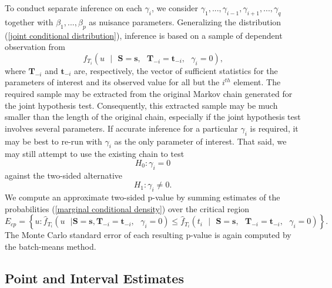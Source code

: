 \documentclass[article, shortnames]{jss}
\begin{document}
To conduct separate inference on each $\gamma _{i}$, we consider $%
\gamma_{1},...,\gamma_{i-1},\gamma_{i+1},...,\gamma_{q}$ together with $%
\beta _{1},...,\beta _{p}$ as nuisance parameters. Generalizing
the distribution (\ref{joint conditional distribution}), inference is based on a
sample of dependent observation from%
\begin{equation}
f_{T_{i}}\left( u \text{ }|\text{ }%
\mathbf{S=s,}\text{ }\mathbf{T}_{-i}=%
\mathbf{t}_{-i},\text{ }\gamma _{i}=0\right) \text{,}
\label{marginal conditional density}
\end{equation}%
where $\mathbf{T}_{-i}$ and
$\mathbf{t}_{-i}$ are, respectively, the
vector of sufficient statistics for the parameters of interest
and its observed value for all but the $i^{th}$ element.
The required sample may be extracted from the original
Markov chain generated for the joint hypothesis test.
Consequently, this extracted sample may be much smaller than the length
of the original chain, especially
if the joint hypothesis test involves several parameters.
If accurate inference for a particular $\gamma_i$ is required,
it may be best to re-run  with $\gamma_i$
as the only parameter of interest.
That said, we may still attempt to use the existing chain to test
\begin{equation*}
H_{0}:\gamma _{i}=0
\end{equation*}%
against the two-sided alternative%
\begin{equation*}
H_{1}:\gamma _{i}\neq 0.
\end{equation*}
We compute an approximate two-sided p-value by summing estimates of
the probabilities (\ref{marginal conditional density}) over the critical region%
\begin{equation*}
E_{cp}=\left\{ u:\hat{f}_{T_{i}}\left( u\text{ }|\text{
}\mathbf{S=s},\text{
}\mathbf{T}_{-i}=\mathbf{t}_{-i},\text{ }\gamma _{i}=0\right) \leq \hat{f}%
_{T_{i}}\left( t_{i}\text{ }|\text{ }\mathbf{S=s,}\text{ }\mathbf{T}_{-i}=%
\mathbf{t}_{-i},\text{ }\gamma _{i}=0\right) \right\} .
\end{equation*}%
The Monte Carlo standard error of each resulting p-value is again
computed by the batch-means method.

\subsection{Point and Interval Estimates}
\end{document}
